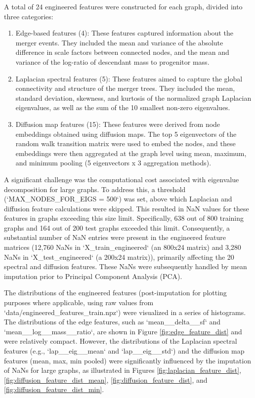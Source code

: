\documentclass[twocolumn]{aastex631}
\begin{document}
A total of 24 engineered features were constructed for each graph, divided into three categories:
\begin{enumerate}
    \item Edge-based features (4): These features captured information about the merger events. They included the mean and variance of the absolute difference in scale factors between connected nodes, and the mean and variance of the log-ratio of descendant mass to progenitor mass.
    \item Laplacian spectral features (5): These features aimed to capture the global connectivity and structure of the merger trees. They included the mean, standard deviation, skewness, and kurtosis of the normalized graph Laplacian eigenvalues, as well as the sum of the 10 smallest non-zero eigenvalues.
    \item Diffusion map features (15): These features were derived from node embeddings obtained using diffusion maps. The top 5 eigenvectors of the random walk transition matrix were used to embed the nodes, and these embeddings were then aggregated at the graph level using mean, maximum, and minimum pooling (5 eigenvectors x 3 aggregation methods).
\end{enumerate}

A significant challenge was the computational cost associated with eigenvalue decomposition for large graphs. To address this, a threshold (`MAX\_NODES\_FOR\_EIGS = 500`) was set, above which Laplacian and diffusion feature calculations were skipped. This resulted in NaN values for these features in graphs exceeding this size limit. Specifically, 638 out of 800 training graphs and 164 out of 200 test graphs exceeded this limit. Consequently, a substantial number of NaN entries were present in the engineered feature matrices (12,760 NaNs in `X\_train\_engineered` (an 800x24 matrix) and 3,280 NaNs in `X\_test\_engineered` (a 200x24 matrix)), primarily affecting the 20 spectral and diffusion features. These NaNs were subsequently handled by mean imputation prior to Principal Component Analysis (PCA).

The distributions of the engineered features (post-imputation for plotting purposes where applicable, using raw values from `data/engineered\_features\_train.npz`) were visualized in a series of histograms. The distributions of the edge features, such as `mean\_\_delta\_\_sf` and `mean\_\_log\_\_mass\_\_ratio`, are shown in Figure \ref{fig:edge_feature_dist} and were relatively compact. However, the distributions of the Laplacian spectral features (e.g., `lap\_\_eig\_\_mean` and `lap\_\_eig\_\_std`) and the diffusion map features (mean, max, min pooled) were significantly influenced by the imputation of NaNs for large graphs, as illustrated in Figures \ref{fig:laplacian_feature_dist}, \ref{fig:diffusion_feature_dist_mean}, \ref{fig:diffusion_feature_dist}, and \ref{fig:diffusion_feature_dist_min}.
\end{document}
